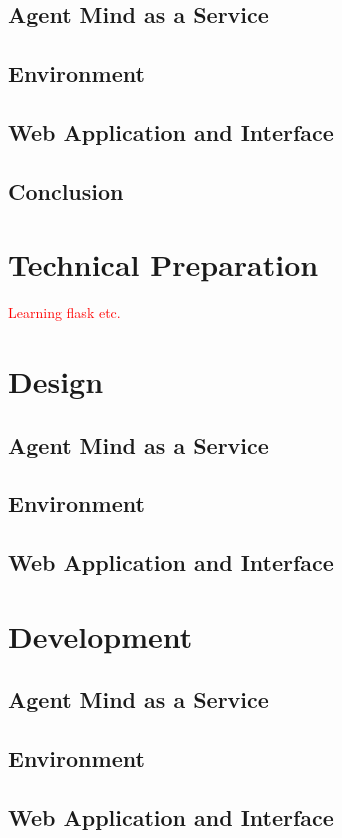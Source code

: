 \documentclass[]{final_report}
\begin{document}
\subsection{Agent Mind as a Service}
\subsection{Environment}
\subsection{Web Application and Interface}
\subsection{Conclusion}

\section{Technical Preparation}
\textcolor{red}{Learning flask etc.}

\section{Design}

\subsection{Agent Mind as a Service}
\subsection{Environment}
\subsection{Web Application and Interface}

\section{Development}

\subsection{Agent Mind as a Service}
\subsection{Environment}
\subsection{Web Application and Interface}
\end{document}
